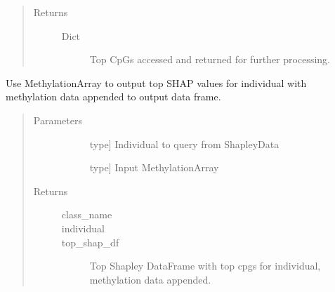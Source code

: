 \documentclass[letterpaper,10pt,english]{sphinxmanual}
\begin{document}
\begin{fulllineitems}
\begin{fulllineitems}
\begin{quote}
\begin{description}
\begin{description}
\end{description}

\item[{Returns}] \leavevmode\begin{description}
\item[{Dict}] \leavevmode
Top CpGs accessed and returned for further processing.

\end{description}

\end{description}\end{quote}

\end{fulllineitems}


\begin{fulllineitems}
\label{\detokenize{index:methylnet.interpretation_classes.ShapleyDataExplorer.view_methylation}}
Use MethylationArray to output top SHAP values for individual with methylation data appended to output data frame.
\begin{quote}\begin{description}
\item[{Parameters}] \leavevmode\begin{description}
\item[{}] \leavevmode{[}type{]}
Individual to query from ShapleyData

\item[{}] \leavevmode{[}type{]}
Input MethylationArray

\end{description}

\item[{Returns}] \leavevmode\begin{description}
\item[{class\_name}] \leavevmode
\item[{individual}] \leavevmode
\item[{top\_shap\_df}] \leavevmode
Top Shapley DataFrame with top cpgs for individual, methylation data appended.

\end{description}

\end{description}\end{quote}

\end{fulllineitems}


\end{fulllineitems}
\end{document}
